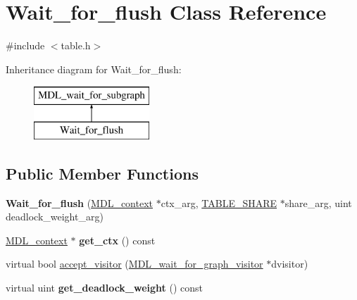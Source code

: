 \hypertarget{classWait__for__flush}{}\section{Wait\+\_\+for\+\_\+flush Class Reference}
\label{classWait__for__flush}


{\ttfamily \#include $<$table.\+h$>$}

Inheritance diagram for Wait\+\_\+for\+\_\+flush\+:\begin{figure}[H]
\begin{center}
\leavevmode
\includegraphics[height=2.000000cm]{classWait__for__flush}
\end{center}
\end{figure}
\subsection*{Public Member Functions}
\begin{DoxyCompactItemize}
\item 
\mbox{\label{classWait__for__flush_ab31bfc72003cfd06524e6684a145bd1f}} 
{\bfseries Wait\+\_\+for\+\_\+flush} (\mbox{\hyperlink{classMDL__context}{M\+D\+L\+\_\+context}} $\ast$ctx\+\_\+arg, \mbox{\hyperlink{structTABLE__SHARE}{T\+A\+B\+L\+E\+\_\+\+S\+H\+A\+RE}} $\ast$share\+\_\+arg, uint deadlock\+\_\+weight\+\_\+arg)
\item 
\mbox{\label{classWait__for__flush_aac79a7a9a462ff44040a331ac80d205b}} 
\mbox{\hyperlink{classMDL__context}{M\+D\+L\+\_\+context}} $\ast$ {\bfseries get\+\_\+ctx} () const
\item 
virtual bool \mbox{\hyperlink{classWait__for__flush_a5d355af9c8dd888cf46b6c5c24552900}{accept\+\_\+visitor}} (\mbox{\hyperlink{classMDL__wait__for__graph__visitor}{M\+D\+L\+\_\+wait\+\_\+for\+\_\+graph\+\_\+visitor}} $\ast$dvisitor)
\item 
\mbox{\label{classWait__for__flush_afb9f4fbb266e8f286acad4369460fd3d}} 
virtual uint {\bfseries get\+\_\+deadlock\+\_\+weight} () const
\end{DoxyCompactItemize}
